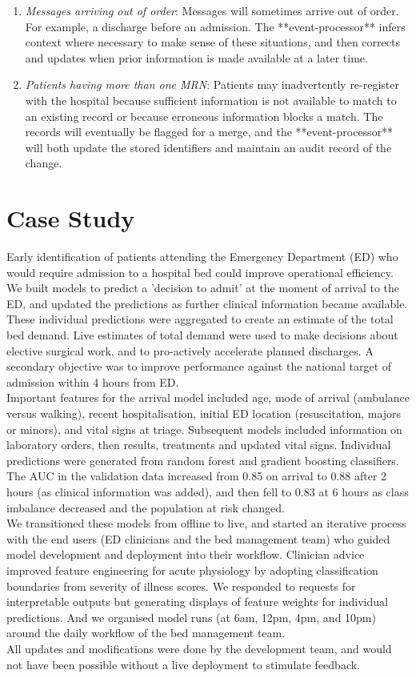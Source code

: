 \documentclass[pmlr,twocolumn,10pt]{jmlr} %
\begin{document}
\begin{enumerate}
\begin{enumerate}
        \item \textit{Messages arriving out of order}: Messages will sometimes arrive out of order. For example, a discharge before an admission. The **event-processor** infers context where necessary to make sense of these situations, and then corrects and updates when prior information is made available at a later time.
        \item \textit{Patients having more than one MRN}: Patients may inadvertently re-register with the hospital because sufficient information is not available to match to an existing record or because erroneous information blocks a match. The records will eventually be flagged for a merge, and the **event-processor** will both update the stored identifiers and maintain an audit record of the change.
    \end{enumerate}
\end{enumerate}

\section{Case Study}
Early identification of patients attending the Emergency Department (ED) who would require admission to a hospital bed could improve operational efficiency. We built models to predict a 'decision to admit' at the moment of arrival to the ED, and updated the predictions as further clinical information became available. These individual predictions were aggregated to create an estimate of the total bed demand. Live estimates of total demand were used to make decisions about elective surgical work, and to pro-actively accelerate planned discharges. 
A secondary objective was to improve performance against the national target of admission within 4 hours from ED.\citep{kings2021} \\
Important features for the arrival model included age, mode of arrival (ambulance versus walking), recent hospitalisation, initial ED location (resuscitation, majors or minors), and vital signs at triage. Subsequent models included information on laboratory orders, then results, treatments and updated vital signs. Individual predictions were generated from random forest and gradient boosting classifiers. The AUC in the validation data increased from 0.85 on arrival to 0.88 after 2 hours (as clinical information was added), and then fell to 0.83 at 6 hours as class imbalance decreased and the population at risk changed.\\
We transitioned these models from offline to live, and started an iterative process with the end users (ED clinicians and the bed management team) who guided model development and deployment into their workflow. Clinician advice improved feature engineering for acute physiology by adopting classification boundaries from severity of illness scores. We responded to requests for interpretable outputs but generating displays of feature weights for individual predictions. And we organised model runs (at 6am, 12pm, 4pm, and 10pm) around the daily workflow of the bed management team.\\
All updates and modifications were done by the development team, and would not have been possible without a live deployment to stimulate feedback.  
\end{document}
